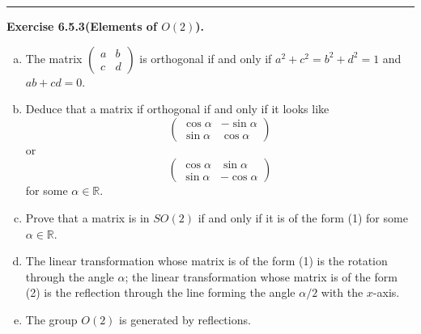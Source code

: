 \documentclass[a4paper, 12pt]{article}
\newenvironment{problem}[2][Exercise]
    { \begin{mdframed}[backgroundcolor=gray!20] \textbf{#1 #2} \\}
    {  \end{mdframed}}
\begin{document}
\noindent\rule{7in}{2.8pt}
\begin{problem}{6.5.3(Elements of \(O(2)\)).}
\begin{enumerate}[(a)]
\item The matrix \(\begin{pmatrix}
    a&b\\ 
    c&d
\end{pmatrix}\) is orthogonal if and only if \(a^2+c^2=b^2+d^2=1\) and \(ab+cd=0\).
\item Deduce that a matrix if orthogonal if and only if it looks like 
\begin{equation}
    \begin{pmatrix}
    \cos \alpha&-\sin \alpha\\ 
    \sin \alpha&\cos \alpha
\end{pmatrix}
\end{equation}
or
\begin{equation}
    \begin{pmatrix}
    \cos \alpha&\sin \alpha\\ 
    \sin \alpha&-\cos \alpha
\end{pmatrix}
\end{equation}
for some \(\alpha\in \mathbb{R}\).
\item Prove that a matrix is in \(SO(2)\) if and only if it is of the form (1) for some \(\alpha\in \mathbb{R}\).
\item The linear transformation whose matrix is of the form (1) is the rotation through the angle \(\alpha\); the linear transformation whose matrix is of the form (2) is 
the reflection through the line forming the angle \(\alpha/2\) with the \(x\)-axis.
\item The group \(O(2)\) is generated by reflections. 
\end{enumerate}
\end{problem}
\end{document}
